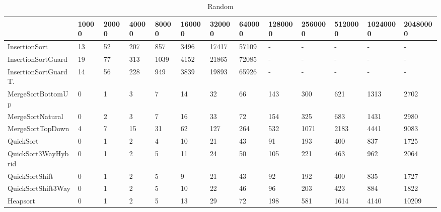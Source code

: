 \begin{table}[h]
\begin{tabular}{|l|l|l|l|l|l|l|l|l|l|l|l|l|}
\hline
 & 10000 & 20000 & 40000 & 80000 & 160000 & 320000 & 640000 & 1280000 & 2560000 & 5120000 & 10240000 & 20480000 \\ \hline
InsertionSort & 13 & 52 & 207 & 857 & 3496 & 17417 & 57109 & - & - & - & - & - \\ \hline
InsertionSortGuard & 19 & 77 & 313 & 1039 & 4152 & 21865 & 72085 & - & - & - & - & - \\ \hline
InsertionSortGuardT. & 14 & 56 & 228 & 949 & 3839 & 19893 & 65926 & - & - & - & - & - \\ \hline
MergeSortBottomUp & 0 & 1 & 3 & 7 & 14 & 32 & 66 & 143 & 300 & 621 & 1313 & 2702 \\ \hline
MergeSortNatural & 0 & 2 & 3 & 7 & 16 & 33 & 72 & 154 & 325 & 683 & 1431 & 2980 \\ \hline
MergeSortTopDown & 4 & 7 & 15 & 31 & 62 & 127 & 264 & 532 & 1071 & 2183 & 4441 & 9083 \\ \hline
QuickSort & 0 & 1 & 2 & 4 & 10 & 21 & 43 & 91 & 193 & 400 & 837 & 1725 \\ \hline
QuickSort3WayHybrid & 0 & 1 & 2 & 5 & 11 & 24 & 50 & 105 & 221 & 463 & 962 & 2064 \\ \hline
QuickSortShift & 0 & 1 & 2 & 5 & 9 & 21 & 43 & 92 & 192 & 400 & 835 & 1727 \\ \hline
QuickSortShift3Way & 0 & 1 & 2 & 5 & 10 & 22 & 46 & 96 & 203 & 423 & 884 & 1822 \\ \hline
Heapsort & 0 & 1 & 2 & 5 & 13 & 29 & 72 & 198 & 581 & 1614 & 4140 & 10209 \\ \hline
\end{tabular}
\caption{Random}
\end{table}
